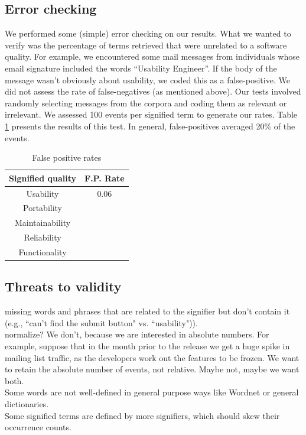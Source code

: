 \documentclass[conference, compsoc]{IEEEtran}
\begin{document}
\subsection{Error checking}
We performed some (simple) error checking on our results. What we wanted to verify was the percentage of terms retrieved that were unrelated to a software quality. For example, we encountered some mail messages from individuals whose email signature included the words ``Usability Engineer''. If the body of the message wasn't obviously about usability, we coded this as a false-positive. We did not assess the rate of false-negatives (as mentioned above). Our tests involved randomly selecting messages from the corpora and coding them as relevant or irrelevant. We assessed 100 events per signified term to generate our rates. Table \ref{tbl:error} presents the results of this test. In general, false-positives averaged 20\% of the events.

\begin{table}
	\caption{False positive rates}
	\centering
	\label{tbl:error}
\begin{tabular}{|c|c|}
\hline
Signified quality & F.P. Rate  \\
\hline
\hline
Usability & 0.06\\ \hline
Portability & \\ \hline
Maintainability & \\ \hline
Reliability & \\ \hline
Functionality & \\ \hline
\hline
\end{tabular}
\end{table}

\subsection{Threats to validity}
missing words and phrases that are related to the signifier but don't contain it (e.g., ``can't find the submit button" vs. ``usability")). \\
normalize? We don't, because we are interested in absolute numbers. For example, suppose that in the month prior to the release we get a huge spike in mailing list traffic, as the developers work out the features to be frozen. We want to retain the absolute number of events, not relative. Maybe not, maybe we want both.\\
Some words are not well-defined in general purpose ways like Wordnet or general dictionaries.\\
Some signified terms are defined by more signifiers, which should skew their occurrence counts.\\
\end{document}
